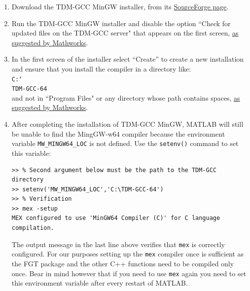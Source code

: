 \documentclass{book}
\begin{document}
\begin{enumerate}

\item Download the TDM-GCC MinGW installer, from its \href{https://sourceforge.net/projects/tdm-gcc/}{SourceForge page}.


\item Run the TDM-GCC MinGW installer and disable the option ``Check for
updated files on the TDM-GCC server" that appears on the first screen,
\href{https://uk.mathworks.com/help/releases/R2015b/matlab/matlab_external/install-mingw-support-package.html}
{as suggested by Mathworks}.

\item In the first screen of the installer select ``Create'' to create a new
installation and ensure that you install the compiler in a directory like:\\
{\tt C:\char`\\TDM-GCC-64}\\
and not in ``Program Files" or any directory whose path contains spaces, 
\href{https://uk.mathworks.com/help/releases/R2015b/matlab/matlab_external/install-mingw-support-package.html}
{as suggested by Mathworks}.

\item After completing the installation of TDM-GCC MinGW, MATLAB will still be
unable to find the MingGW-w64 compiler because the environment variable
{\tt MW\_MINGW64\_LOC}
is not defined.
Use the {\tt setenv()} command to set this variable:

\begin{verbatim}
>> % Second argument below must be the path to the TDM-GCC directory
>> setenv('MW_MINGW64_LOC','C:\TDM-GCC-64')
>> % Verification
>> mex -setup
MEX configured to use 'MinGW64 Compiler (C)' for C language compilation.
\end{verbatim}

The output message in the last line above verifies that {\tt mex} is correctly configured.
For our purposes setting up the {\tt mex} compiler once is sufficient as the FGT package
and the other C++ functions need to be compiled only once. Bear in mind
however that if you need to use {\tt mex} again
you need to set this environment variable after every restart of MATLAB.

\end{enumerate}
\end{document}
